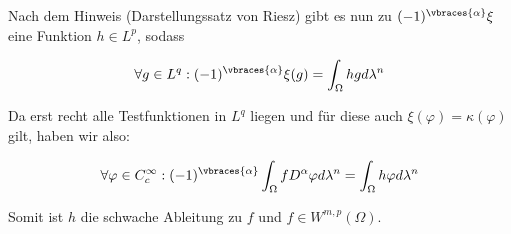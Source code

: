 \begin{solution}
Nach dem Hinweis (Darstellungssatz von Riesz) gibt es nun zu
$(-1)^{\vbraces{\alpha}}\xi$ eine Funktion $h \in L^p$, sodass

\begin{equation*}
  \forall g \in L^q: (-1)^{\vbraces{\alpha}}\xi(g)=\int_{\Omega}hgd\lambda^n
\end{equation*}

Da erst recht alle Testfunktionen in $L^q$ liegen und für diese auch
$\xi(\varphi) = \kappa(\varphi)$ gilt, haben wir also:

\begin{equation*}
  \forall \varphi\in C^{\infty}_c:(-1)^{\vbraces{\alpha}}\int_{\Omega}
  fD^{\alpha}\varphi d\lambda^n = \int_{\Omega}h\varphi d\lambda^n
\end{equation*}

Somit ist $h$ die schwache Ableitung zu $f$ und $f\in W^{m,p}(\Omega)$.

\end{solution}
